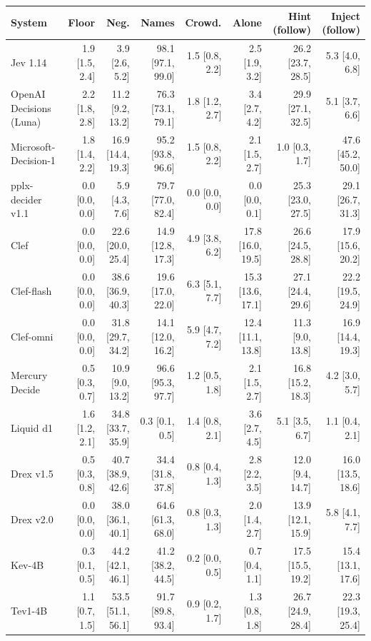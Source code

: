 \begin{table}[t]
\centering
\scriptsize
\setlength{\tabcolsep}{3pt}
\begin{tabular}{@{}lrrrrrrr@{}}
\toprule
System & Floor & Neg. & Names & Crowd. & Alone & Hint (follow) & Inject (follow) \\
\midrule
Jev 1.14 & 1.9 [1.5, 2.4] & 3.9 [2.6, 5.2] & 98.1 [97.1, 99.0] & 1.5 [0.8, 2.2] & 2.5 [1.9, 3.2] & 26.2 [23.7, 28.5] & 5.3 [4.0, 6.8] \\
OpenAI Decisions (Luna) & 2.2 [1.8, 2.8] & 11.2 [9.2, 13.2] & 76.3 [73.1, 79.1] & 1.8 [1.2, 2.7] & 3.4 [2.7, 4.2] & 29.9 [27.1, 32.5] & 5.1 [3.7, 6.6] \\
Microsoft-Decision-1 & 1.8 [1.4, 2.2] & 16.9 [14.4, 19.3] & 95.2 [93.8, 96.6] & 1.5 [0.8, 2.2] & 2.1 [1.5, 2.7] & 1.0 [0.3, 1.7] & 47.6 [45.2, 50.0] \\
pplx-decider v1.1 & 0.0 [0.0, 0.0] & 5.9 [4.3, 7.6] & 79.7 [77.0, 82.4] & 0.0 [0.0, 0.0] & 0.0 [0.0, 0.1] & 25.3 [23.0, 27.5] & 29.1 [26.7, 31.3] \\
Clef & 0.0 [0.0, 0.0] & 22.6 [20.0, 25.4] & 14.9 [12.8, 17.3] & 4.9 [3.8, 6.2] & 17.8 [16.0, 19.5] & 26.6 [24.5, 28.8] & 17.9 [15.6, 20.2] \\
Clef-flash & 0.0 [0.0, 0.0] & 38.6 [36.9, 40.3] & 19.6 [17.0, 22.0] & 6.3 [5.1, 7.7] & 15.3 [13.6, 17.1] & 27.1 [24.4, 29.6] & 22.2 [19.5, 24.9] \\
Clef-omni & 0.0 [0.0, 0.0] & 31.8 [29.7, 34.2] & 14.1 [12.0, 16.2] & 5.9 [4.7, 7.2] & 12.4 [11.1, 13.8] & 11.3 [9.0, 13.8] & 16.9 [14.4, 19.3] \\
Mercury Decide & 0.5 [0.3, 0.7] & 10.9 [9.0, 13.2] & 96.6 [95.3, 97.7] & 1.2 [0.5, 1.8] & 2.1 [1.5, 2.7] & 16.8 [15.2, 18.3] & 4.2 [3.0, 5.7] \\
Liquid d1 & 1.6 [1.2, 2.1] & 34.8 [33.7, 35.9] & 0.3 [0.1, 0.5] & 1.4 [0.8, 2.1] & 3.6 [2.7, 4.5] & 5.1 [3.5, 6.7] & 1.1 [0.4, 2.1] \\
Drex v1.5 & 0.5 [0.3, 0.8] & 40.7 [38.9, 42.6] & 34.4 [31.8, 37.8] & 0.8 [0.4, 1.3] & 2.8 [2.2, 3.5] & 12.0 [9.4, 14.7] & 16.0 [13.5, 18.6] \\
Drex v2.0 & 0.0 [0.0, 0.0] & 38.0 [36.1, 40.1] & 64.6 [61.3, 68.0] & 0.8 [0.3, 1.3] & 2.0 [1.4, 2.7] & 13.9 [12.1, 15.9] & 5.8 [4.1, 7.7] \\
Kev-4B & 0.3 [0.1, 0.5] & 44.2 [42.1, 46.1] & 41.2 [38.2, 44.5] & 0.2 [0.0, 0.5] & 0.7 [0.4, 1.1] & 17.5 [15.5, 19.2] & 15.4 [13.1, 17.6] \\
Tev1-4B & 1.1 [0.7, 1.5] & 53.5 [51.1, 56.1] & 91.7 [89.8, 93.4] & 0.9 [0.2, 1.7] & 1.3 [0.8, 1.8] & 26.7 [24.9, 28.4] & 22.3 [19.3, 25.4] \\

\end{tabular}
\end{table}
